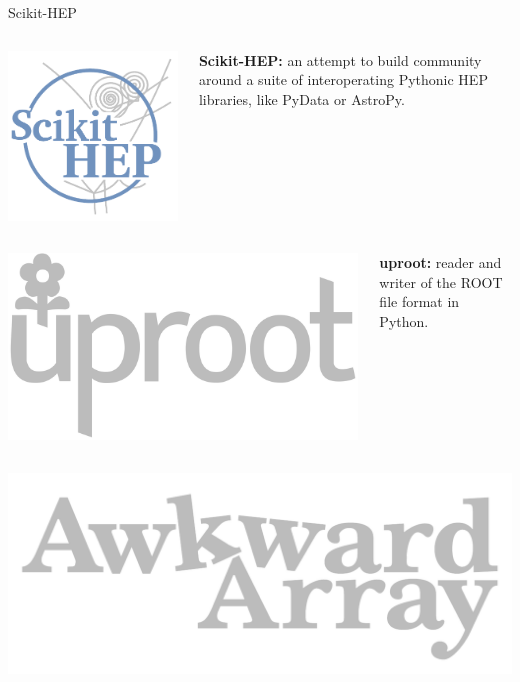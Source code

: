 \documentclass[aspectratio=169]{beamer}
\begin{document}
\begin{frame}{Scikit-HEP}
\large
\vspace{0.2 cm}
\begin{columns}
\column{2.5 cm}
\hfill \includegraphics[width=0.8\linewidth]{skhep-logo.pdf}

{\bf Scikit-HEP:} an attempt to build community around a suite of interoperating Pythonic HEP libraries, like PyData or AstroPy.
\end{columns}

\begin{columns}
\column{2.5 cm}
\hfill \includegraphics[width=0.8\linewidth]{uproot-logo.pdf}

{\bf uproot:} reader and writer of the ROOT file format in Python.
\end{columns}

\vspace{0.1 cm}
\begin{columns}
\column{2.5 cm}
\includegraphics[width=\linewidth]{awkward-logo.pdf}


\end{columns}
\end{frame}
\end{document}
